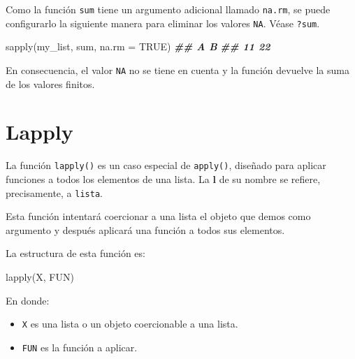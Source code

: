 \documentclass[
]{book}
\newenvironment{Shaded}{\begin{snugshade}}{\end{snugshade}}
\newcommand{\AttributeTok}[1]{\textcolor[rgb]{0.77,0.63,0.00}{#1}}
\newcommand{\ConstantTok}[1]{\textcolor[rgb]{0.00,0.00,0.00}{#1}}
\newcommand{\DocumentationTok}[1]{\textcolor[rgb]{0.56,0.35,0.01}{\textbf{\textit{#1}}}}
\newcommand{\FunctionTok}[1]{\textcolor[rgb]{0.00,0.00,0.00}{#1}}
\newcommand{\NormalTok}[1]{#1}
\providecommand{\tightlist}{%
  \setlength{\itemsep}{0pt}\setlength{\parskip}{0pt}}
\begin{document}
Como la función \texttt{sum} tiene un argumento adicional llamado \texttt{na.rm}, se puede configurarlo la siguiente manera para eliminar los valores \texttt{NA}. Véase \texttt{?sum}.

\begin{Shaded}
\begin{Highlighting}[]
\FunctionTok{sapply}\NormalTok{(my\_list, sum, }\AttributeTok{na.rm =} \ConstantTok{TRUE}\NormalTok{)}
\DocumentationTok{\#\#  A  B }
\DocumentationTok{\#\# 11 22}
\end{Highlighting}
\end{Shaded}

En consecuencia, el valor \texttt{NA} no se tiene en cuenta y la función devuelve la suma de los valores finitos.

\hypertarget{lapply}{%
\section{Lapply}\label{lapply}}

La función \texttt{lapply()} es un caso especial de \texttt{apply()}, diseñado para aplicar funciones a todos los elementos de una lista. La \textbf{l} de su nombre se refiere, precisamente, a \texttt{lista}.

Esta función intentará coercionar a una lista el objeto que demos como argumento y después aplicará una función a todos sus elementos.

La estructura de esta función es:

\begin{Shaded}
\begin{Highlighting}[]
\FunctionTok{lapply}\NormalTok{(X, FUN)}
\end{Highlighting}
\end{Shaded}

En donde:

\begin{itemize}
\tightlist
\item
  \texttt{X} es una lista o un objeto coercionable a una lista.
\item
  \texttt{FUN} es la función a aplicar.
\end{itemize}
\end{document}
